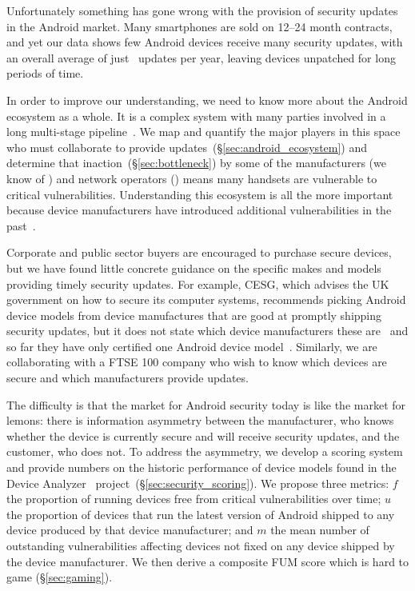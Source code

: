 \documentclass{sig-alternate-2013}
\newcommand{\da}{Device Analyzer}
\begin{document}
Unfortunately something has gone wrong with the provision of security updates in the Android market. 
Many smartphones are sold on 12--24 month contracts, and yet our data shows few Android devices receive many security updates, with an overall average of just \daUpdatesPerYearNominal\ updates per year, leaving devices unpatched for long periods of time.

In order to improve our understanding, we need to know more about the Android ecosystem as a whole.
It is a complex system with many parties involved in a long multi-stage pipeline~\cite{HTC2013}.
We map and quantify the major players in this space who must collaborate to provide updates~(\S\ref{sec:android_ecosystem}) and determine that inaction~(\S\ref{sec:bottleneck}) by some of the manufacturers (we know of \daNumManufacturers) and network operators (\daNumOperators) means many handsets are vulnerable to critical vulnerabilities.
Understanding this ecosystem is all the more important because device manufacturers have introduced additional vulnerabilities in the past~\cite{Grace2012}.

Corporate and public sector buyers are encouraged to purchase secure devices, but we have found little concrete guidance on the specific makes and models providing timely security updates.
For example, CESG, which advises the UK government on how to secure its computer systems, recommends picking Android device models from device manufactures that are good at promptly shipping security updates, but it does not state which device manufacturers these are~\cite{CESG2013} and so far they have only certified one Android device model~\cite{CESG2015}.
Similarly, we are collaborating with a FTSE 100 company who wish to know which devices are secure and which manufacturers provide updates.

The difficulty is that the market for Android security today is like the market for lemons: there is information asymmetry between the manufacturer, who knows whether the device is currently secure and will receive security updates, and the customer, who does not.
To address the asymmetry, we develop a scoring system and provide numbers on the historic performance of device models found in the \da~\cite{Wagner2013} project~(\S\ref{sec:security_scoring}).
We propose three metrics:
$f$ the proportion of running devices free from critical vulnerabilities over time;
$u$ the proportion of devices that run the latest version of Android shipped to any device produced by that device manufacturer; and
$m$ the mean number of outstanding vulnerabilities affecting devices not fixed on any device shipped by the device manufacturer.
We then derive a composite FUM score which is hard to game (\S\ref{sec:gaming}).
\end{document}
